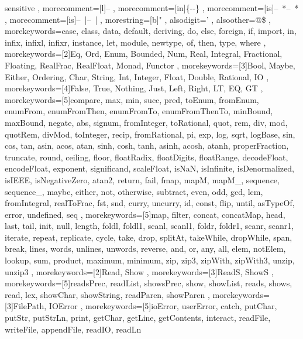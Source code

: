 %
%

%
{ sensitive%
, morecomment=[l]{--}
, morecomment=[in]{\{-}{-\}}%
, morecomment=[is]{--\ *}{--\ *}%
, morecomment=[is]{--\ |}{--\ |}%
, morestring=[b]"%
, alsodigit={'}%
, alsoother={@\$}%
%
%
%
, morekeywords={case, class, data, default, deriving, do, else, foreign, if, import, in, infix, infixl, infixr, instance, let, module, newtype, of, then, type, where}%
%
, morekeywords=[2]{Eq, Ord, Enum, Bounded, Num, Real, Integral, Fractional, Floating, RealFrac, RealFloat, Monad, Functor}%
, morekeywords=[3]{Bool, Maybe, Either, Ordering, Char, String, Int, Integer, Float, Double, Rational, IO}%
, morekeywords=[4]{False, True, Nothing, Just, Left, Right, LT, EQ, GT}%
, morekeywords=[5]{compare, max, min, succ, pred, toEnum, fromEnum, enumFrom, enumFromThen, enumFromTo, enumFromThenTo, minBound, maxBound, negate, abs, signum, fromInteger, toRational, quot, rem, div, mod, quotRem, divMod, toInteger, recip, fromRational, pi, exp, log, sqrt, logBase, sin, cos, tan, asin, acos, atan, sinh, cosh, tanh, asinh, acosh, atanh, properFraction, truncate, round, ceiling, floor, floatRadix, floatDigits, floatRange, decodeFloat, encodeFloat, exponent, significand, scaleFloat, isNaN, isInfinite, isDenormalized, isIEEE, isNegativeZero, atan2, return, fail, fmap, mapM, mapM_, sequence, sequence_, maybe, either, not, otherwise, subtract, even, odd, gcd, lcm, fromIntegral, realToFrac, fst, snd, curry, uncurry, id, const, flip, until, asTypeOf, error, undefined, seq}%
%
, morekeywords=[5]{map, filter, concat, concatMap, head, last, tail, init, null, length, foldl, foldl1, scanl, scanl1, foldr, foldr1, scanr, scanr1, iterate, repeat, replicate, cycle, take, drop, splitAt, takeWhile, dropWhile, span, break, lines, words, unlines, unwords, reverse, and, or, any, all, elem, notElem, lookup, sum, product, maximum, minimum, zip, zip3, zipWith, zipWith3, unzip, unzip3}%
%
, morekeywords=[2]{Read, Show}%
, morekeywords=[3]{ReadS, ShowS}%
, morekeywords=[5]{readsPrec, readList, showsPrec, show, showList, reads, shows, read, lex, showChar, showString, readParen, showParen}%
%
, morekeywords=[3]{FilePath, IOError}%
, morekeywords=[5]{ioError, userError, catch, putChar, putStr, putStrLn, print, getChar, getLine, getContents, interact, readFile, writeFile, appendFile, readIO, readLn}%
}%
%

